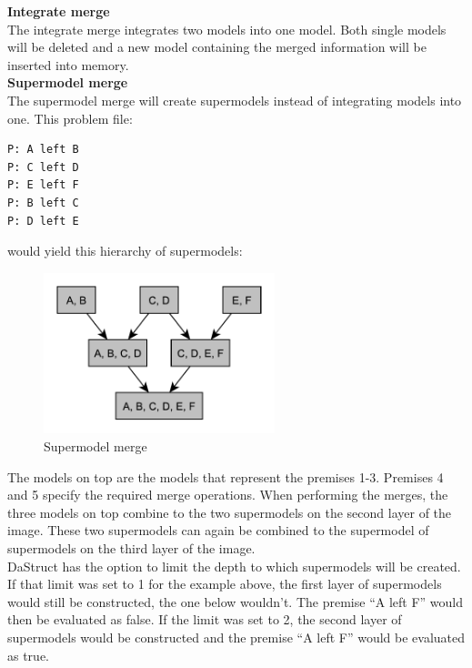 \documentclass[hidelinks]{scrartcl}
\begin{document}
\textbf{Integrate merge} \\
The integrate merge integrates two models into one model. Both single models will be deleted and a new model containing the merged information will be inserted into memory. \\

\textbf{Supermodel merge} \\
The supermodel merge will create supermodels instead of integrating models into one. This problem file:

\begin{lstlisting}[caption=Problem files for merges, label=pf_merging, frame=single]
P: A left B
P: C left D
P: E left F
P: B left C
P: D left E
\end{lstlisting}

would yield this hierarchy of supermodels:

\begin{figure}[H]
	\caption{Supermodel merge}
	\label{img:supermodel_merge}
	\centering
	\includegraphics[width=0.6\textwidth]{Illustrations/supermodel_merge.pdf}
\end{figure}

The models on top are the models that represent the premises 1-3. Premises 4 and 5 specify the required merge operations. When performing the merges, the three models on top combine to the two supermodels on the second layer of the image. These two supermodels can again be combined to the supermodel of supermodels on the third layer of the image. \\
DaStruct has the option to limit the depth to which supermodels will be created. If that limit was set to 1 for the example above, the first layer of supermodels would still be constructed, the one below wouldn't. The premise ``A left F'' would then be evaluated as false. If the limit was set to 2, the second layer of supermodels would be constructed and the premise ``A left F'' would be evaluated as true.
\end{document}
